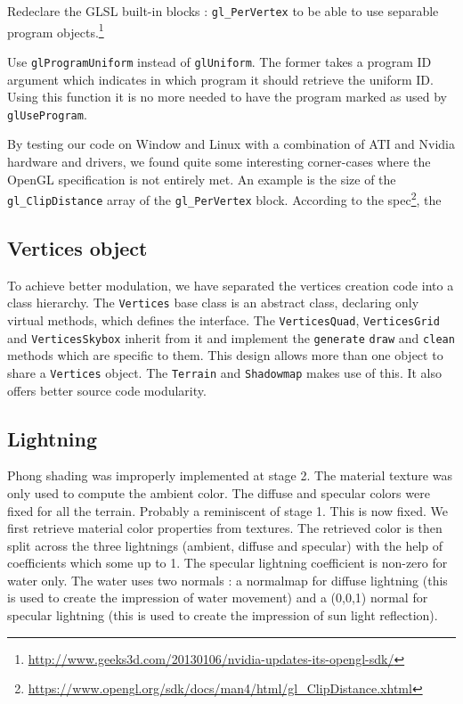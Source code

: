 \documentclass[a4paper,11pt]{article}
\begin{document}
Redeclare the GLSL built-in blocks : \texttt{gl\_PerVertex} to be able to use separable program objects.\footnote{\url{http://www.geeks3d.com/20130106/nvidia-updates-its-opengl-sdk/}}

Use \texttt{glProgramUniform} instead of \texttt{glUniform}. The former takes a program ID argument which indicates in which program it should retrieve the uniform ID. Using this function it is no more needed to have the program marked as used by \texttt{glUseProgram}.

By testing our code on Window and Linux with a combination of ATI and Nvidia hardware and drivers, we found quite some interesting corner-cases where the OpenGL specification is not entirely met. An example is the size of the \texttt{gl\_ClipDistance} array of the \texttt{gl\_PerVertex} block. According to the spec\footnote{\url{https://www.opengl.org/sdk/docs/man4/html/gl\_ClipDistance.xhtml}}, the

\subsection{Vertices object}

To achieve better modulation, we have separated the vertices creation code into a class hierarchy. The \texttt{Vertices} base class is an abstract class, declaring only virtual methods, which defines the interface. The \texttt{VerticesQuad}, \texttt{VerticesGrid} and \texttt{VerticesSkybox} inherit from it and implement the \texttt{generate} \texttt{draw} and \texttt{clean} methods which are specific to them. This design allows more than one  object to share a \texttt{Vertices} object. The \texttt{Terrain} and \texttt{Shadowmap} makes use of this. It also offers better source code modularity.

\subsection{Lightning}

Phong shading was improperly implemented at stage 2. The material texture was only used to compute the ambient color. The diffuse and specular colors were fixed for all the terrain. Probably a reminiscent of stage 1. This is now fixed. We first retrieve material color properties from textures. The retrieved color is then split across the three lightnings (ambient, diffuse and specular) with the help of coefficients which some up to 1. The specular lightning coefficient is non-zero for water only. The water uses two normals : a normalmap for diffuse lightning (this is used to create the impression of water movement) and a (0,0,1) normal for specular lightning (this is used to create the impression of sun light reflection).
\end{document}
